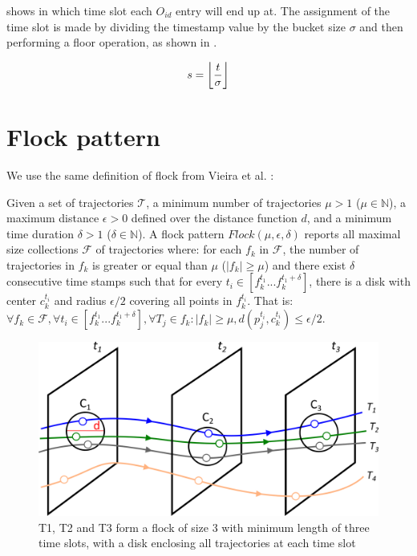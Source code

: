  shows in which time slot each $O_{id}$ entry will end up at. The assignment of the time slot is
made by dividing the timestamp value by the bucket size $\sigma$ and then performing a floor operation, as shown in
.

\begin{equation}
\label{eq:timeslot}
s = \floor*{\frac{t}{\sigma}}
\end{equation}

\section{Flock pattern}
\label{sec:tech_flock}
We use the same definition of flock from Vieira et al. \citep{vieira}:

\begin{Def}
\label{def:flock}
Given a set of trajectories $\mathcal{T}$, a minimum number of trajectories $\mu > 1$ ($\mu \in \mathbb{N}$), a maximum
distance $\epsilon > 0$ defined over the distance function $d$, and a minimum time duration $\delta > 1$ ($\delta \in
\mathbb{N}$). A flock pattern $Flock (\mu, \epsilon, \delta)$ reports all maximal size collections $\mathcal{F}$ of
trajectories where: for each $f_k$ in $\mathcal{F}$, the number of trajectories in $f_k$ is greater or equal than $\mu$
($|f_k| \ge \mu$) and there exist $\delta$ consecutive time stamps such that for every $t_i \in [f_k^{t_1}...f_k^{t_1 +
\delta}]$, there is a disk with center $c_k^{t_i}$ and radius $\epsilon/2$ covering all points in $f_k^{t_i}$. That is:
$\forall f_k \in \mathcal{F}, \forall t_i \in [f_k^{t_1}...f_k^{t_1 + \delta}], \forall T_j \in f_k: |f_k | \ge \mu,
d(p_j^{t_i},c_k^{t_i}) \le \epsilon/2$.
\end{Def}

\begin{figure}[h!]
    \centering
    \includegraphics[width=\textwidth]{images/flock_2.png}
    \caption{T1, T2 and T3 form a flock of size 3 with minimum length of three time slots, with a disk enclosing all
        trajectories at each time slot \citep{vieira}}
    \label{fig:flock2}
\end{figure}

